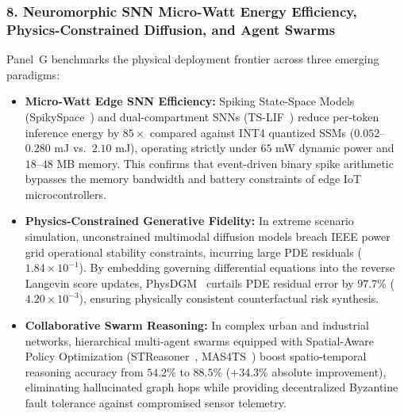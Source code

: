 \subsubsection{8. Neuromorphic SNN Micro-Watt Energy Efficiency, Physics-Constrained Diffusion, and Agent Swarms}
Panel~G benchmarks the physical deployment frontier across three emerging paradigms:
\begin{itemize}
    \item \textbf{Micro-Watt Edge SNN Efficiency:} Spiking State-Space Models (SpikySpace~\cite{Chen2026SpikySpace}) and dual-compartment SNNs (TS-LIF~\cite{Feng2025TSLIF}) reduce per-token inference energy by $85\times$ compared against INT4 quantized SSMs ($0.052$--$0.280$ mJ vs.\ $2.10$ mJ), operating strictly under $65$ mW dynamic power and $18$--$48$ MB memory. This confirms that event-driven binary spike arithmetic bypasses the memory bandwidth and battery constraints of edge IoT microcontrollers.
    \item \textbf{Physics-Constrained Generative Fidelity:} In extreme scenario simulation, unconstrained multimodal diffusion models breach IEEE power grid operational stability constraints, incurring large PDE residuals ($1.84 \times 10^{-1}$). By embedding governing differential equations into the reverse Langevin score updates, PhysDGM~\cite{Zhang2026PhysDGM} curtails PDE residual error by $97.7\%$ ($4.20 \times 10^{-3}$), ensuring physically consistent counterfactual risk synthesis.
    \item \textbf{Collaborative Swarm Reasoning:} In complex urban and industrial networks, hierarchical multi-agent swarms equipped with Spatial-Aware Policy Optimization (STReasoner~\cite{Liu2026STReasoner}, MAS4TS~\cite{Zhou2026MAS4TS}) boost spatio-temporal reasoning accuracy from $54.2\%$ to $88.5\%$ ($+34.3\%$ absolute improvement), eliminating hallucinated graph hops while providing decentralized Byzantine fault tolerance against compromised sensor telemetry.
\end{itemize}


